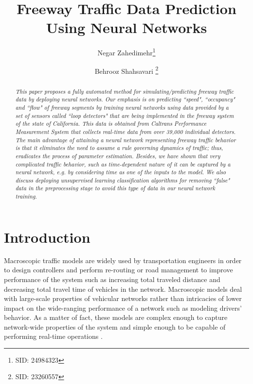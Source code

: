 \documentclass[twocolumn,10pt]{asme2e}
\title{Freeway Traffic Data Prediction Using Neural Networks}
\author{Negar Zahedimehr\thanks{SID: 24984323}
	\affiliation{
		Department of Mechanical Engineering\\
		University of California\\
		Berkeley, California 94720\\
		Email: negar.mehr@berkeley.edu
	}	
}
\author{Behrooz Shahsavari \thanks{SID: 23260557}
	\affiliation{Department of Mechanical Engineering\\
		University of California\\
		Berkeley, California 94720\\
		Email: behrooz@berkeley.edu
	}
}
\begin{document}
	
	\maketitle

\maketitle    

\begin{abstract}
{\it 
	This paper proposes a fully automated method for simulating/predicting freeway traffic data by deploying neural networks. Our emphasis is on predicting ``{speed}", ``{occupancy}" and ``{flow}" of freeway segments by training neural networks using data provided by a set of sensors called ``{loop detectors}" that are being implemented in the freeway system of the state of California. This data is obtained from Caltrans Performance Measurement System  that collects real-time data from over 39,000 individual detectors.
	The main advantage of attaining a neural network representing freeway traffic behavior is that it eliminates the need to assume a rule governing dynamics of traffic; thus, eradicates the process of parameter estimation. Besides, we have shown that very complicated traffic behavior, such as time-dependent nature of it can be captured by a neural network, e.g. by considering time as one of the inputs to the model. 
	We also discuss deploying unsupervised learning classification algorithms for removing ``false" data in the preprocessing stage to avoid this type of data in our neural network training.
}
\end{abstract}

\section{Introduction}

\par Macroscopic traffic models are widely used by transportation engineers in order to design controllers and perform re-routing or road management to improve performance of the system such as increasing total traveled distance and decreasing total travel time of vehicles in the network. Macroscopic models deal with large-scale properties of vehicular networks rather than intricacies of lower impact on the wide-ranging performance of a network such as modeling drivers' behavior. As a matter of fact, these models are complex enough to capture network-wide properties of the system and simple enough to be capable of performing real-time operations \cite{MacroModels}.
\end{document}
